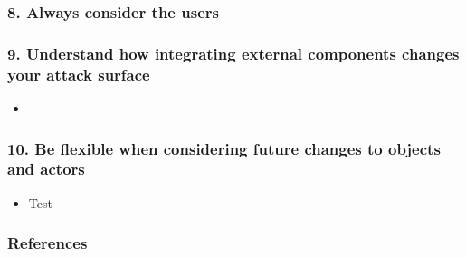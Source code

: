 \documentclass[12pt,norsk]{beamer}
\begin{document}
\begin{frame}

	\frametitle{8. Always consider the users}
	

\end{frame}

\begin{frame}

	\frametitle{9. Understand how integrating external components changes your attack surface}
	
	\begin{itemize}
		\item 
	\end{itemize}
	

\end{frame}

\begin{frame}

	\frametitle{10. Be flexible when considering future changes to objects and actors}
	\begin{itemize}
		\item Test \cite{sample}
	\end{itemize}
	
	

\end{frame}

\begin{frame}

	\frametitle{References}
		
	
		

\end{frame}




\end{document}
